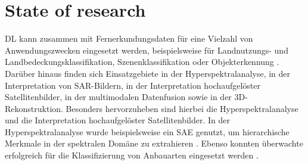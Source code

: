 \chapter{State of research}
\label{ch:state_of_research}












\acrlong{DL} kann zusammen mit Fernerkundungsdaten für eine Vielzahl von Anwendungszwecken eingesetzt werden, beispielsweise für Landnutzungs- und Landbedeckungsklassifikation, Szenenklassifikation oder Objekterkennung \cite{Zhu2017}. Darüber hinaus finden sich Einsatzgebiete in der Hyperspektralanalyse, in der Interpretation von \acrshort{SAR}-Bildern, in der Interpretation hochaufgelöster Satellitenbilder, in der multimodalen Datenfusion sowie in der 3D-Rekonstruktion. Besonders hervorzuheben sind hierbei die Hyperspektralanalyse und die Interpretation hochaufgelöster Satellitenbilder. In der Hyperspektralanalyse wurde beispielsweise ein \acrlong{SAE} genutzt, um hierarchische Merkmale in der spektralen Domäne zu extrahieren \cite{Chen2014}. Ebenso konnten überwachte  erfolgreich für die Klassifizierung von Anbauarten eingesetzt werden \cite{Kussul2017}.

